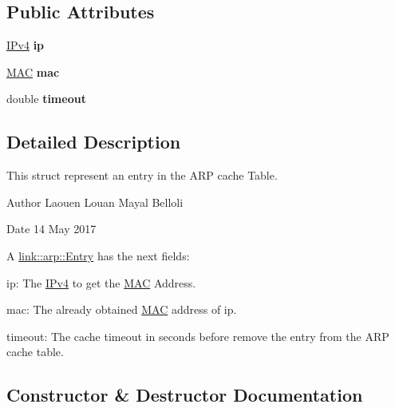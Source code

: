 \subsection*{Public Attributes}
\begin{DoxyCompactItemize}
\item 
\hyperlink{structIPv4}{I\+Pv4} {\bfseries ip}\hypertarget{structlink_1_1arp_1_1Entry_a40929f76ac846faefab32e92b290c92f}{}\label{structlink_1_1arp_1_1Entry_a40929f76ac846faefab32e92b290c92f}

\item 
\hyperlink{structMAC}{M\+AC} {\bfseries mac}\hypertarget{structlink_1_1arp_1_1Entry_a72cdde0b5131b1ecc350f5ae28bb7f8a}{}\label{structlink_1_1arp_1_1Entry_a72cdde0b5131b1ecc350f5ae28bb7f8a}

\item 
double {\bfseries timeout}\hypertarget{structlink_1_1arp_1_1Entry_a8838c1d16cd38f16032703d00742df7a}{}\label{structlink_1_1arp_1_1Entry_a8838c1d16cd38f16032703d00742df7a}

\end{DoxyCompactItemize}


\subsection{Detailed Description}
This struct represent an entry in the A\+RP cache Table. 

\begin{DoxyAuthor}{Author}
Laouen Louan Mayal Belloli 
\end{DoxyAuthor}
\begin{DoxyDate}{Date}
14 May 2017
\end{DoxyDate}
A \hyperlink{structlink_1_1arp_1_1Entry}{link\+::arp\+::\+Entry} has the next fields\+:
\begin{DoxyEnumerate}
\item ip\+: The \hyperlink{structIPv4}{I\+Pv4} to get the \hyperlink{structMAC}{M\+AC} Address.
\item mac\+: The already obtained \hyperlink{structMAC}{M\+AC} address of ip.
\item timeout\+: The cache timeout in seconds before remove the entry from the A\+RP cache table. 
\end{DoxyEnumerate}

\subsection{Constructor \& Destructor Documentation}
